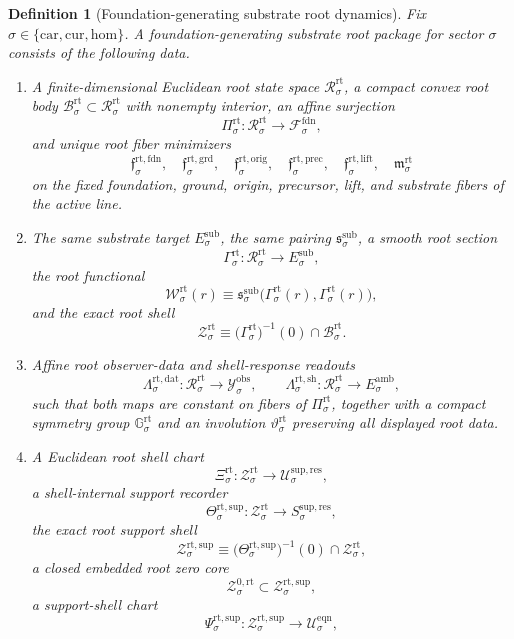 \documentclass[11pt]{article}
\newcommand{\Car}{\mathrm{car}}
\newcommand{\Cur}{\mathrm{cur}}
\newcommand{\Hom}{\mathrm{hom}}
\newcommand{\DataSpace}[1]{\mathcal Y_{#1}^{\mathrm{obs}}}
\newcommand{\AmbientTarget}[1]{E_{#1}^{\mathrm{amb}}}
\newcommand{\SubTarget}[1]{E_{#1}^{\mathrm{sub}}}
\newcommand{\SubPair}[1]{\mathfrak s_{#1}^{\mathrm{sub}}}
\newcommand{\FoundSpace}[1]{\mathcal F_{#1}^{\mathrm{fdn}}}
\newcommand{\RootSpace}[1]{\mathcal R_{#1}^{\mathrm{rt}}}
\newcommand{\RootBody}[1]{\mathcal B_{#1}^{\mathrm{rt}}}
\newcommand{\RootProj}[1]{\Pi_{#1}^{\mathrm{rt}}}
\newcommand{\RootFoundMin}[1]{\mathfrak f_{#1}^{\mathrm{rt,fdn}}}
\newcommand{\RootGroundMin}[1]{\mathfrak f_{#1}^{\mathrm{rt,grd}}}
\newcommand{\RootOrigMin}[1]{\mathfrak f_{#1}^{\mathrm{rt,orig}}}
\newcommand{\RootPrecMin}[1]{\mathfrak f_{#1}^{\mathrm{rt,prec}}}
\newcommand{\RootLiftMin}[1]{\mathfrak f_{#1}^{\mathrm{rt,lift}}}
\newcommand{\RootSubMin}[1]{\mathfrak m_{#1}^{\mathrm{rt}}}
\newcommand{\RootSection}[1]{\Gamma_{#1}^{\mathrm{rt}}}
\newcommand{\RootFunctional}[1]{\mathscr W_{#1}^{\mathrm{rt}}}
\newcommand{\RootData}[1]{\Lambda_{#1}^{\mathrm{rt,dat}}}
\newcommand{\RootShellMap}[1]{\Lambda_{#1}^{\mathrm{rt,sh}}}
\newcommand{\RootSym}[1]{\mathbb G_{#1}^{\mathrm{rt}}}
\newcommand{\RootTime}[1]{\vartheta_{#1}^{\mathrm{rt}}}
\newcommand{\RootShellSet}[1]{\mathcal Z_{#1}^{\mathrm{rt}}}
\newcommand{\RootChart}[1]{\Xi_{#1}^{\mathrm{rt}}}
\newcommand{\RootSupport}[1]{\Theta_{#1}^{\mathrm{rt,sup}}}
\newcommand{\RootSupportShell}[1]{\mathcal Z_{#1}^{\mathrm{rt,sup}}}
\newcommand{\RootZeroCore}[1]{\mathcal Z_{#1}^{0,\mathrm{rt}}}
\newcommand{\RootEqChart}[1]{\Psi_{#1}^{\mathrm{rt,sup}}}
\newcommand{\ResSpace}[1]{\mathcal U_{#1}^{\mathrm{sup,res}}}
\newcommand{\ResTarget}[1]{S_{#1}^{\mathrm{sup,res}}}
\newcommand{\EqnSpace}[1]{\mathcal U_{#1}^{\mathrm{eqn}}}
\newtheorem{definition}{Definition}
\begin{document}
\begin{definition}[Foundation-generating substrate root dynamics]
\label{def:root}
Fix \(\sigma\in\{\Car,\Cur,\Hom\}\). A foundation-generating substrate root package for sector \(\sigma\) consists of the following data.
\begin{enumerate}
    \item A finite-dimensional Euclidean root state space \(\RootSpace{\sigma}\), a compact convex root body \(\RootBody{\sigma}\subset\RootSpace{\sigma}\) with nonempty interior, an affine surjection
    \[
    \RootProj{\sigma}:\RootSpace{\sigma}\to\FoundSpace{\sigma},
    \]
    and unique root fiber minimizers
    \[
    \RootFoundMin{\sigma},\quad
    \RootGroundMin{\sigma},\quad
    \RootOrigMin{\sigma},\quad
    \RootPrecMin{\sigma},\quad
    \RootLiftMin{\sigma},\quad
    \RootSubMin{\sigma}
    \]
    on the fixed foundation, ground, origin, precursor, lift, and substrate fibers of the active line.
    \item The same substrate target \(\SubTarget{\sigma}\), the same pairing \(\SubPair{\sigma}\), a smooth root section
    \[
    \RootSection{\sigma}:\RootSpace{\sigma}\to\SubTarget{\sigma},
    \]
    the root functional
    \[
    \RootFunctional{\sigma}(r)
    \equiv
    \SubPair{\sigma}\bigl(\RootSection{\sigma}(r),\RootSection{\sigma}(r)\bigr),
    \]
    and the exact root shell
    \[
    \RootShellSet{\sigma}
    \equiv
    \bigl(\RootSection{\sigma}\bigr)^{-1}(0)\cap\RootBody{\sigma}.
    \]
    \item Affine root observer-data and shell-response readouts
    \[
    \RootData{\sigma}:\RootSpace{\sigma}\to\DataSpace{\sigma},
    \qquad
    \RootShellMap{\sigma}:\RootSpace{\sigma}\to\AmbientTarget{\sigma},
    \]
    such that both maps are constant on fibers of \(\RootProj{\sigma}\), together with a compact symmetry group \(\RootSym{\sigma}\) and an involution \(\RootTime{\sigma}\) preserving all displayed root data.
    \item A Euclidean root shell chart
    \[
    \RootChart{\sigma}:\RootShellSet{\sigma}\to\ResSpace{\sigma},
    \]
    a shell-internal support recorder
    \[
    \RootSupport{\sigma}:\RootShellSet{\sigma}\to\ResTarget{\sigma},
    \]
    the exact root support shell
    \[
    \RootSupportShell{\sigma}
    \equiv
    \bigl(\RootSupport{\sigma}\bigr)^{-1}(0)\cap\RootShellSet{\sigma},
    \]
    a closed embedded root zero core
    \[
    \RootZeroCore{\sigma}\subset\RootSupportShell{\sigma},
    \]
    a support-shell chart
    \[
    \RootEqChart{\sigma}:\RootSupportShell{\sigma}\to\EqnSpace{\sigma},
\]
\end{enumerate}
\end{definition}
\end{document}
